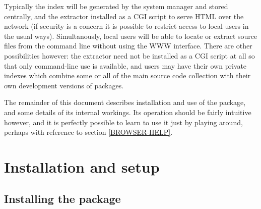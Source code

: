\documentclass[twoside,11pt]{article}
\newcommand{\xlabel}[1]{}
\renewcommand{\_}{\texttt{\symbol{95}}}
\begin{document}
Typically the index
will be generated by the system manager and stored centrally,
and the extractor installed
as a CGI script to serve HTML over the network (if security is 
a concern it is possible to restrict access to local users in the
usual ways).  Simultanously, local users will be able to locate
or extract source files from the command line without using the 
WWW interface.  
There are other possibilities however: the extractor need not be
installed as a CGI script at all so that only command-line use
is available, and users may have their own private indexes 
which combine some or all of the main source code collection 
with their own development versions of packages.

The remainder of this document describes installation and use of
the package, and some details of its internal workings.
Its operation should be fairly intuitive however,
and it is perfectly possible to learn to use it just by playing around,
perhaps with reference to section \ref{BROWSER-HELP}.




\section{\xlabel{sec:install}\label{sec:install}Installation and setup}

\subsection{\xlabel{sec:install-pack}\label{sec:install-pack}Installing the package}
\end{document}
